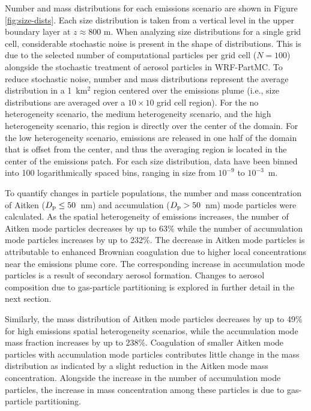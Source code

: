 \documentclass[acp]{copernicus}
\begin{document}
Number and mass distributions for each emissions scenario are shown in
Figure \ref{fig:size-dists}. Each size distribution is taken from a
vertical level in the upper boundary layer at $z\approx800$ m. When
analyzing size distributions for a single grid cell, considerable
stochastic noise is present in the shape of distributions. This is due
to the selected number of computational particles per grid cell ($N =
100$) alongside the stochastic treatment of aerosol particles in
WRF-PartMC. To reduce stochastic noise, number and mass distributions
represent the average distribution in a 1~km$^2$ region centered over
the emissions plume (i.e., size distributions are averaged over a
$10\times10$ grid cell region). For the no heterogeneity scenario, the medium heterogeneity scenario,
and the high heterogeneity scenario, this region is directly over the center of the
domain. For the low heterogeneity scenario, emissions are released in one half of the
domain that is offset from the center, and thus the averaging region
is located in the center of the emissions patch. For each size
distribution, data have been binned into 100 logarithmically spaced
bins, ranging in size from $10^{-9}$ to $10^{-3}$~m.

To quantify changes in particle populations, the number and mass
concentration of Aitken ($D_{\rm p} \leq 50$~nm) and accumulation
($D_{\rm p} > 50$~nm) mode particles were calculated. As the spatial
heterogeneity of emissions increases, the number of Aitken mode
particles decreases by up to 63\% while the number of accumulation
mode particles increases by up to 232\%. The decrease in Aitken mode
particles is attributable to enhanced Brownian coagulation due to
higher local concentrations near the emissions plume core. The
corresponding increase in accumulation mode particles is a result of
secondary aerosol formation.  Changes to aerosol composition due to
gas-particle partitioning is explored in further detail in the next
section.

Similarly, the mass distribution of Aitken mode particles decreases by
up to 49\% for high emissions spatial heterogeneity scenarios, while
the accumulation mode mass fraction increases by up to
238\%. Coagulation of smaller Aitken mode particles with accumulation
mode particles contributes little change in the mass distribution as
indicated by a slight reduction in the Aitken mode mass
concentration. Alongside the increase in the number of accumulation mode 
particles, the increase in mass concentration among these particles is due 
to gas-particle partitioning. 
\end{document}
